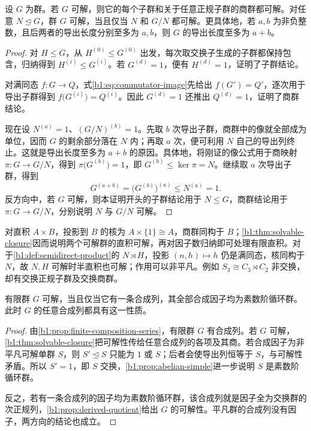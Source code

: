 \begin{theorem}\label{b1:thm:solvable-closure}
	设 \(G\) 为群。若 \(G\) 可解，则它的每个子群和关于任意正规子群的商群都可解。对任意 \(N\trianglelefteq G\)，群 \(G\) 可解，当且仅当 \(N\) 和 \(G/N\) 都可解。更具体地，若 \(a,b\) 为非负整数，且后两者的导出长度分别至多为 \(a,b\)，则 \(G\) 的导出长度至多为 \(a+b\)。
\end{theorem}
\begin{proof}
	对 \(H\le G\)，从 \(H^{(0)}\le G^{(0)}\) 出发，每次取交换子生成的子群都保持包含，归纳得到 \(H^{(i)}\le G^{(i)}\)。若 \(G^{(d)}=1\)，便有 \(H^{(d)}=1\)，证明了子群结论。

	对满同态 \(f:G\to Q\)，式\eqref{b1:eq:commutator-image}先给出 \(f(G')=Q'\)，逐次用于导出子群得到 \(f\bigl(G^{(i)}\bigr)=Q^{(i)}\)。因此 \(G^{(d)}=1\) 还推出 \(Q^{(d)}=1\)，证明了商群结论。

	现在设 \(N^{(a)}=1\)、\((G/N)^{(b)}=1\)。先取 \(b\) 次导出子群，商群中的像就全部成为单位，因而 \(G\) 的剩余部分落在 \(N\) 内；再取 \(a\) 次，便可利用 \(N\) 自己的导出列终止。这就是导出长度至多为 \(a+b\) 的原因。具体地，将刚证的像公式用于商映射 \(\pi:G\to G/N\)，得到 \(\pi\bigl(G^{(b)}\bigr)=1\)，即 \(G^{(b)}\le\ker\pi=N\)。继续取 \(a\) 次导出子群，得到
	\[
		G^{(a+b)}=\bigl(G^{(b)}\bigr)^{(a)}\le N^{(a)}=1.
	\]
	反方向中，若 \(G\) 可解，则本证明开头的子群结论用于 \(N\le G\)，商群结论用于 \(\pi:G\to G/N\)，分别说明 \(N\) 与 \(G/N\) 可解。
\end{proof}

对直积 \(A\times B\)，投影到 \(B\) 的核为 \(A\times\{1\}\cong A\)，商群同构于 \(B\)；\cref{b1:thm:solvable-closure}因而说明两个可解群的直积可解，再对因子数归纳即可处理有限直积。对于\cref{b1:def:semidirect-product}的 \(N\rtimes H\)，投影 \((n,h)\mapsto h\) 仍是满同态，核同构于 \(N\)，故 \(N,H\) 可解时半直积也可解；作用可以非平凡。例如 \(S_3\cong C_3\rtimes C_2\) 非交换，却有交换正规子群及交换商群。

\begin{corollary}[有限可解群的合成因子]\label{b1:cor:solvable-composition-factors}
	有限群 \(G\) 可解，当且仅当它有一条合成列，其全部合成因子均为素数阶循环群。此时 \(G\) 的任意合成列都具有这一性质。
\end{corollary}
\begin{proof}
	由\cref{b1:prop:finite-composition-series}，有限群 \(G\) 有合成列。若 \(G\) 可解，\cref{b1:thm:solvable-closure}把可解性传给任意合成列的各项及其商。若合成因子为非平凡可解单群 \(S\)，则 \(S'\trianglelefteq S\) 只能为 \(1\) 或 \(S\)；后者会使导出列恒等于 \(S\)，与可解性矛盾。所以 \(S'=1\)，即 \(S\) 交换，\cref{b1:prop:abelian-simple}进一步说明 \(S\) 是素数阶循环群。

	反之，若有一条合成列的因子均为素数阶循环群，该合成列就是因子全为交换群的次正规列，\cref{b1:prop:derived-quotient}给出 \(G\) 的可解性。平凡群的合成列没有因子，两方向的结论也成立。
\end{proof}

